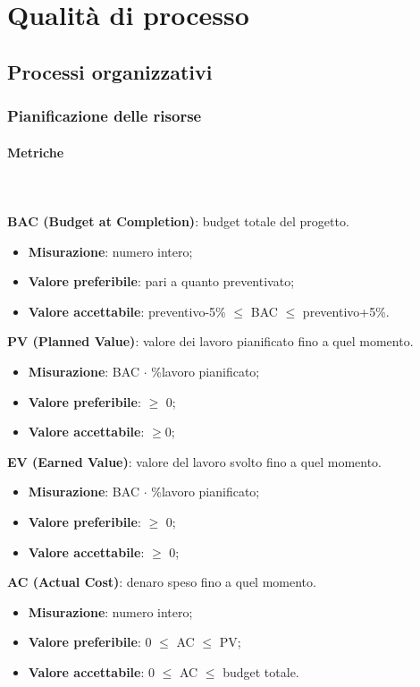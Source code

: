 \section{Qualità di processo}
	\subsection{Processi organizzativi}
		\subsubsection{Pianificazione delle risorse}
			\paragraph{Metriche} \mbox{} \\ \\
				\textbf{BAC (Budget at Completion)}: budget totale del progetto\glo.
				\begin{itemize}
					\item \textbf{Misurazione}: numero intero;
					\item \textbf{Valore preferibile}: pari a quanto preventivato;
					\item \textbf{Valore accettabile}: preventivo-5\% $\le$ BAC $\le$ preventivo+5\%.
				\end{itemize}
				\textbf{PV (Planned Value)}: valore dei lavoro pianificato fino a quel momento.
				\begin{itemize}
					\item \textbf{Misurazione}: BAC $\cdot$ \%lavoro pianificato;
					\item \textbf{Valore preferibile}: $\ge$ 0;
					\item \textbf{Valore accettabile}: $\ge$0;
				\end{itemize}
				\textbf{EV (Earned Value)}: valore del lavoro svolto fino a quel momento.
				\begin{itemize}
					\item \textbf{Misurazione}: BAC $\cdot$ \%lavoro pianificato;
					\item \textbf{Valore preferibile}: $\ge$ 0;
					\item \textbf{Valore accettabile}: $\ge$ 0;
				\end{itemize}
				\textbf{AC (Actual Cost)}: denaro speso fino a quel momento.
				\begin{itemize}
					\item \textbf{Misurazione}: numero intero;
					\item \textbf{Valore preferibile}: 0 $\le$ AC $\le$ PV;
					\item \textbf{Valore accettabile}: 0 $\le$ AC $\le$ budget totale.
				\end{itemize}
